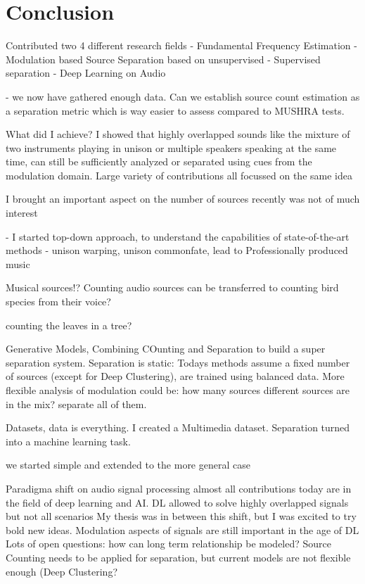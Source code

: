 \chapter{Conclusion}

Contributed two 4 different research fields
- Fundamental Frequency Estimation
- Modulation based Source Separation based on unsupervised
- Supervised separation
- Deep Learning on Audio

- we now have gathered enough data. Can we establish source count estimation as a separation metric which is way easier to assess compared to MUSHRA tests.

 What did I achieve?
I showed that highly overlapped sounds like the mixture of two instruments playing in unison or multiple speakers speaking at the same time, can still be sufficiently analyzed or separated using cues from the modulation domain. 
Large variety of contributions all focussed on the same idea

I brought an important aspect on the number of sources recently was not of much interest

- I started top-down approach, to understand the capabilities of state-of-the-art methods
- unison warping, unison commonfate, lead to Professionally produced music

Musical sources!?
Counting audio sources can be transferred to counting bird species from their voice?

counting the leaves in a tree?

Generative Models, 
Combining COunting and Separation to build a super separation system.
Separation is static: Todays methods assume a fixed number of sources (except for Deep Clustering), are trained using balanced data. More flexible analysis of modulation could be: how many sources different sources are in the mix? separate all of them.

Datasets, data is everything. I created a Multimedia dataset. 
Separation turned into a machine learning task.

we started simple and extended to the more general case

Paradigma shift on audio signal processing almost all contributions today are in the field of deep learning and AI.
DL allowed to solve highly overlapped signals but not all scenarios
My thesis was in between this shift, but I was excited to try bold new ideas. 
Modulation aspects of signals are still important in the age of DL
Lots of open questions: how can long term relationship be modeled?
Source Counting needs to be applied for separation, but current models are not flexible enough (Deep Clustering?

